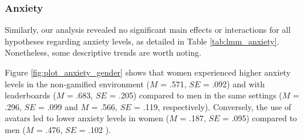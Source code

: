 \subsubsection{Anxiety}
Similarly, our analysis revealed no significant main effects or interactions for all hypotheses regarding anxiety levels, as detailed in Table \ref{tab:lmm_anxiety}. Nonetheless, some descriptive trends are worth noting.

Figure \ref{fig:plot_anxiety_gender} shows that women experienced higher anxiety levels in the non-gamified environment ($M$ = .571, $SE$ = .092) and with leaderboards ($M$ = .683, $SE$ = .205) compared to men in the same settings ($M$ = .296, $SE$ = .099 and $M$ = .566, $SE$ = .119, respectively). Conversely, the use of avatars led to lower anxiety levels in women ($M$ = .187, $SE$ = .095) compared to men ($M$ = .476, $SE$ = .102 ).

